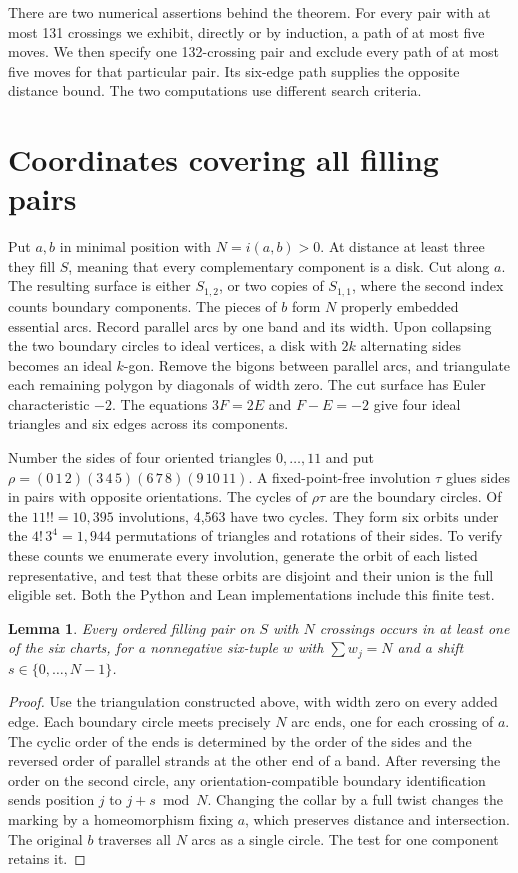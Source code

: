 \documentclass[11pt,a4paper]{article}
\newtheorem{lemma}[theorem]{Lemma}
\begin{document}
There are two numerical assertions behind the theorem. For every pair with at
most 131 crossings we exhibit, directly or by induction, a path of at most five
moves. We then specify one 132-crossing pair and exclude every path of at most
five moves for that particular pair. Its six-edge path supplies the opposite
distance bound. The two computations use different search criteria.

\clearpage
\section{Coordinates covering all filling pairs}\label{sec:atlas}
Put \(a,b\) in minimal position with \(N=i(a,b)>0\). At distance at least three
they fill \(S\), meaning that every complementary component is a disk. Cut along
\(a\). The resulting surface is either \(S_{1,2}\), or two copies of \(S_{1,1}\),
where the second index counts boundary components. The pieces of \(b\) form
\(N\) properly embedded essential arcs. Record parallel arcs by one band and
its width. Upon collapsing the two boundary circles to ideal vertices, a disk with
\(2k\) alternating sides becomes an ideal \(k\)-gon. Remove the bigons between
parallel arcs, and triangulate each remaining polygon by diagonals of width zero.
The cut surface has Euler characteristic \(-2\). The equations \(3F=2E\) and
\(F-E=-2\) give four ideal triangles and six edges across its components.

Number the sides of four oriented triangles \(0,\ldots,11\) and put
\(\rho=(0\,1\,2)(3\,4\,5)(6\,7\,8)(9\,10\,11)\). A fixed-point-free
involution \(\tau\) glues sides in pairs with opposite orientations. The cycles
of \(\rho\tau\) are the boundary circles. Of the \(11!!=10{,}395\) involutions,
4,563 have two cycles. They form six orbits under the \(4!\,3^4=1{,}944\)
permutations of triangles and rotations of their sides. To verify these counts
we enumerate every involution, generate the orbit of each listed representative,
and test that these orbits are disjoint and their union is the full eligible set.
Both the Python and Lean implementations include this finite test.

\begin{lemma}\label{lem:cover}
Every ordered filling pair on \(S\) with \(N\) crossings occurs in at least one of
the six charts, for a nonnegative six-tuple \(w\) with \(\sum w_j=N\) and a
shift \(s\in\{0,\ldots,N-1\}\).
\end{lemma}
\begin{proof}
Use the triangulation constructed above, with width zero on every added edge.
Each boundary circle meets precisely \(N\) arc ends, one for each crossing of
\(a\). The cyclic order of the ends is determined by the order of the sides and
the reversed order of parallel strands at the other end of a band. After
reversing the order on the second circle, any orientation-compatible boundary
identification sends position \(j\) to \(j+s\bmod N\). Changing the collar by
a full twist changes the marking by a homeomorphism fixing \(a\), which
preserves distance and intersection. The original \(b\) traverses all \(N\)
arcs as a single circle. The test for one component retains it.
\end{proof}
\end{document}
